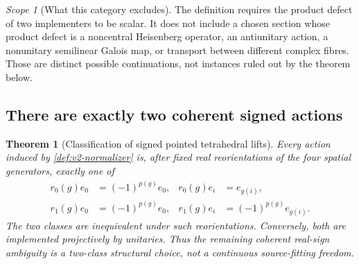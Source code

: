 \documentclass[11pt]{article}
\newtheorem{theorem}{Theorem}[section]
\theoremstyle{definition}
\theoremstyle{remark}
\newtheorem{scope}[scope]{Scope}
\begin{document}
\begin{scope}[What this category excludes]
The definition requires the product defect of two implementers to be scalar.
It does not include a chosen section whose product defect is a noncentral
Heisenberg operator, an antiunitary action, a nonunitary semilinear Galois
map, or transport between different complex fibres. Those are distinct
possible continuations, not instances ruled out by the theorem below.
\end{scope}

\subsection{There are exactly two coherent signed actions}

\begin{theorem}[Classification of signed pointed tetrahedral lifts]
\label{thm:v2-signed-classification}
Every action induced by \cref{def:v2-normalizer} is, after fixed real
reorientations of the four spatial generators, exactly one of
\begin{align}
 r_0(g)e_0&=(-1)^{p(g)}e_0,&
 r_0(g)e_i&=e_{g(i)},\\
 r_1(g)e_0&=(-1)^{p(g)}e_0,&
 r_1(g)e_i&=(-1)^{p(g)}e_{g(i)}.
 \label{eq:v2-two-actions}
\end{align}
The two classes are inequivalent under such reorientations. Conversely,
both are implemented projectively by unitaries. Thus the remaining
coherent real-sign ambiguity is a two-class structural choice, not a
continuous source-fitting freedom.
\end{theorem}
\end{document}
